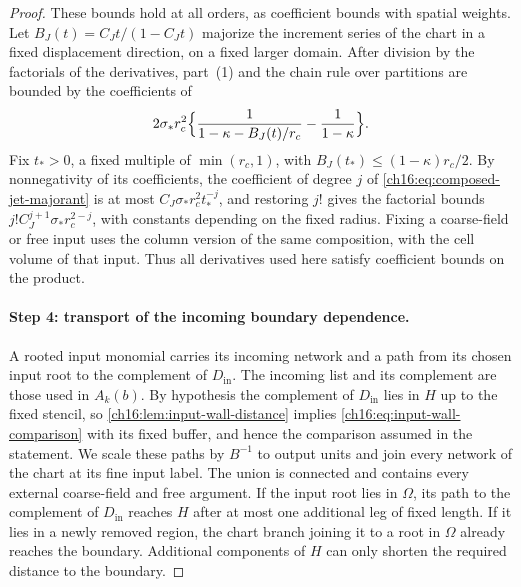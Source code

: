 \begin{proof}
These bounds hold at all orders, as coefficient bounds with spatial weights. Let $B_J(t)=C_Jt/(1-C_Jt)$ majorize the increment series of the chart in a fixed displacement direction, on a fixed larger domain. After division by the factorials of the derivatives, part~(1) and the chain rule over partitions are bounded by the coefficients of
\begin{equation}\label{ch16:eq:composed-jet-majorant}
 2\sigma_*r_c^2
 \Bigl\{\frac1{1-\kappa-B_J(t)/r_c}
                          -\frac1{1-\kappa}\Bigr\}.
\end{equation}
Fix $t_*>0$, a fixed multiple of $\min(r_c,1)$, with $B_J(t_*)\le(1-\kappa)r_c/2$. By nonnegativity of its coefficients, the coefficient of degree $j$ of \eqref{ch16:eq:composed-jet-majorant} is at most $C_J\sigma_*r_c^2t_*^{-j}$, and restoring $j!$ gives the factorial bounds $j!C_J^{j+1}\sigma_*r_c^{2-j}$, with constants depending on the fixed radius. Fixing a coarse-field or free input uses the column version of the same composition, with the cell volume of that input. Thus all derivatives used here satisfy coefficient bounds on the product.

\paragraph{Step 4: transport of the incoming boundary dependence.}
A rooted input monomial carries its incoming network and a path from its chosen input root to the complement of $D_{\mathrm{in}}$. The incoming list and its complement are those used in $A_k(b)$. By hypothesis the complement of $D_{\mathrm{in}}$ lies in $H$ up to the fixed stencil, so \cref{ch16:lem:input-wall-distance} implies \eqref{ch16:eq:input-wall-comparison} with its fixed buffer, and hence the comparison assumed in the statement. We scale these paths by $B^{-1}$ to output units and join every network of the chart at its fine input label. The union is connected and contains every external coarse-field and free argument. If the input root lies in $\Omega$, its path to the complement of $D_{\mathrm{in}}$ reaches $H$ after at most one additional leg of fixed length. If it lies in a newly removed region, the chart branch joining it to a root in $\Omega$ already reaches the boundary. Additional components of $H$ can only shorten the required distance to the boundary.


\end{proof}
